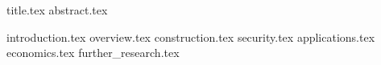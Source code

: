 \documentclass[11pt]{llncs}
\begin{document}
{title.tex}
\thispagestyle{plain}
{abstract.tex}

{introduction.tex}
{overview.tex}
{construction.tex}
{security.tex}
{applications.tex}
{economics.tex}
{further_research.tex}



\end{document}
